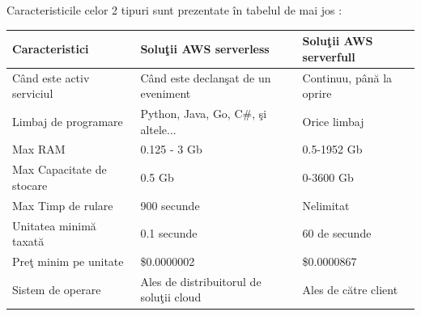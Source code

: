 \documentclass[a4paper,12pt]{report}
\begin{document}
\par Caracteristicile celor 2 tipuri sunt prezentate în tabelul de mai jos :
\begin{table}[h]
\begin{tabular}{|l|l|l|}
\hline
Caracteristici             & Soluţii AWS serverless                  & Soluţii AWS serverfull                          \\ \hline
Când este activ serviciul & Când este declanşat de un eveniment     & Continuu, până la oprire \\ \hline
Limbaj de programare      & Python, Java, Go, C\#,  şi altele...    & Orice limbaj                                     \\ \hline
Max RAM                   & 0.125 - 3 Gb                            & 0.5-1952 Gb                                      \\ \hline
Max Capacitate de stocare & 0.5 Gb                                  & 0-3600 Gb                                        \\ \hline
Max Timp de rulare        & 900 secunde                             & Nelimitat                                        \\ \hline
Unitatea minimă taxată    & 0.1 secunde                             & 60 de secunde                                    \\ \hline
Preţ minim pe unitate     & \$0.0000002                             & \$0.0000867                                      \\ \hline
Sistem de operare         & Ales de distribuitorul de soluţii cloud & Ales de către client                             \\ \hline
\end{tabular}
\end{table}
\end{document}
